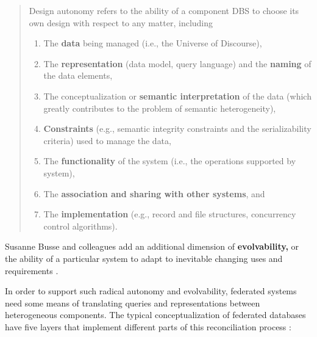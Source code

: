\documentclass[notoc]{tufte-book}
\begin{document}
\begin{quote}
Design autonomy refers to the ability of a component DBS to choose its
own design with respect to any matter, including

\begin{enumerate}
\def\labelenumi{(\alph{enumi})}
\item
  The \textbf{data} being managed (i.e., the Universe of Discourse),
\item
  The \textbf{representation} (data model, query language) and the
  \textbf{naming} of the data elements,
\item
  The conceptualization or \textbf{semantic interpretation} of the data
  (which greatly contributes to the problem of semantic heterogeneity),
\item
  \textbf{Constraints} (e.g., semantic integrity constraints and the
  serializability criteria) used to manage the data,
\item
  The \textbf{functionality} of the system (i.e., the operations
  supported by system),
\item
  The \textbf{association and sharing with other systems}, and
\item
  The \textbf{implementation} (e.g., record and file structures,
  concurrency control algorithms).
\end{enumerate}
\end{quote}

Susanne Busse and colleagues add an additional dimension of
\textbf{evolvability,} or the ability of a particular system to adapt to
inevitable changing uses and requirements \citep{busseFederatedInformationSystems1999} .

In order to support such radical autonomy and evolvability, federated
systems need some means of translating queries and representations
between heterogeneous components. The typical conceptualization of
federated databases have five layers that implement different parts of
this reconciliation process \citep{shethFederatedDatabaseSystems1990} :
\end{document}
